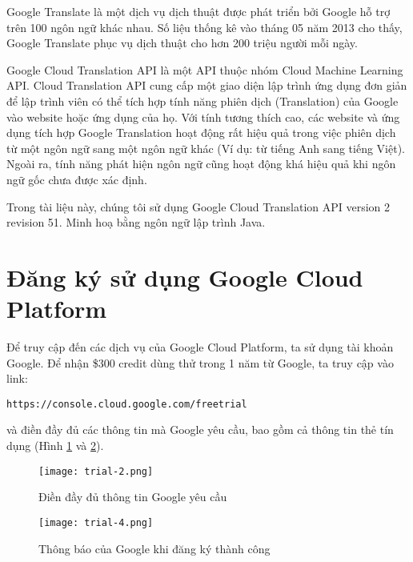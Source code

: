 \documentclass[../thesis.tex]{subfiles}
\begin{document}

Google Translate là một dịch vụ dịch thuật được phát triển bởi Google hỗ trợ trên 100 ngôn ngữ khác nhau. Số liệu thống kê vào tháng 05 năm 2013 cho thấy, Google Translate phục vụ dịch thuật cho hơn 200 triệu người mỗi ngày.

Google Cloud Translation API là một API thuộc nhóm Cloud Machine Learning API. Cloud Translation API cung cấp một giao diện lập trình ứng dụng đơn giản để lập trình viên có thể tích hợp tính năng phiên dịch (Translation) của Google vào website hoặc ứng dụng của họ. Với tính tương thích cao, các website và ứng dụng tích hợp Google Translation hoạt động rất hiệu quả trong việc phiên dịch từ một ngôn ngữ sang một ngôn ngữ khác (Ví dụ: từ tiếng Anh sang tiếng Việt). Ngoài ra, tính năng phát hiện ngôn ngữ cũng hoạt động khá hiệu quả khi ngôn ngữ gốc chưa được xác định.

Trong tài liệu này, chúng tôi sử dụng Google Cloud Translation API version 2 revision 51. Minh hoạ bằng ngôn ngữ lập trình Java. 

\section{Đăng ký sử dụng Google Cloud Platform}

Để truy cập đến các dịch vụ của Google Cloud Platform, ta sử dụng tài khoản Google. Để nhận \$300 credit dùng thử trong 1 năm từ Google, ta truy cập vào link:
\begin{lstlisting}[style=link]
https://console.cloud.google.com/freetrial
\end{lstlisting}
và điền đầy đủ các thông tin mà Google yêu cầu, bao gồm cả thông tin thẻ tín dụng (Hình \ref{Dien day du thong tin ma Google yeu cau} và \ref{Thong bao cua Google khi dang ky thanh cong}).

\begin{figure}
	\texttt{[image: trial-2.png]}
	\caption{Điền đầy đủ thông tin Google yêu cầu}
	\label{Dien day du thong tin ma Google yeu cau}
\end{figure}

\begin{figure}
	\texttt{[image: trial-4.png]}
	\caption{Thông báo của Google khi đăng ký thành công}
	\label{Thong bao cua Google khi dang ky thanh cong}
\end{figure}
\end{document}
